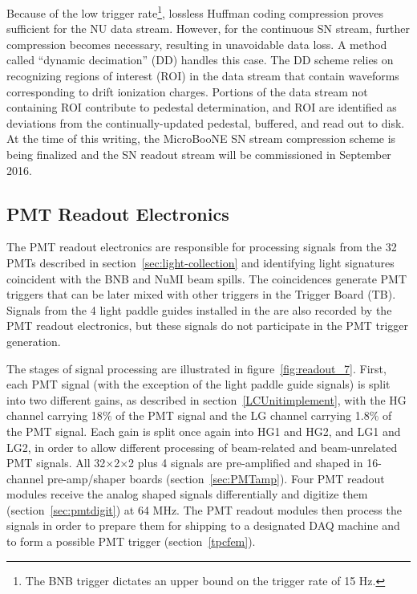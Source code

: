 Because of the low trigger rate\footnote{The BNB trigger dictates an upper bound on the trigger rate of 15 Hz.}, lossless Huffman coding compression proves sufficient for the NU data stream. However, for the continuous SN stream, further compression becomes necessary, resulting in unavoidable data loss. A method called ``dynamic decimation'' (DD) handles this case. The DD scheme relies on recognizing regions of interest (ROI) in the data stream that contain waveforms corresponding to drift ionization charges. Portions of the data stream not containing ROI contribute to pedestal determination, and ROI are identified as deviations from the continually-updated pedestal, buffered, and read out to disk. At the time of this writing, the MicroBooNE SN stream compression scheme is being finalized and the SN readout stream will be commissioned in September 2016.

\subsection{PMT Readout Electronics}

The PMT readout electronics are responsible for processing signals from the 32 PMTs described in section~\ref{sec:light-collection} and identifying light signatures coincident with the BNB and NuMI beam spills. The coincidences generate PMT triggers that can be later mixed with other triggers in the Trigger Board (TB). Signals from the 4 light paddle guides installed in the \lartpc are also recorded by the PMT readout electronics, but these signals do not participate in the PMT trigger generation. 

The stages of signal processing are illustrated in figure~\ref{fig:readout_7}. First, each PMT signal (with the exception of the light paddle guide signals) is split into two different gains, as described in section~\ref{LCUnitimplement}, with the HG channel carrying 18$\%$ of the PMT signal and the LG channel carrying 1.8$\%$ of the PMT signal. Each gain is split once again into HG1 and HG2, and LG1 and LG2, in order to allow different processing of beam-related and beam-unrelated PMT signals. All 32$\times$2$\times$2 plus 4 signals are pre-amplified and shaped in 16-channel pre-amp/shaper boards (section~\ref{sec:PMTamp}). Four PMT readout modules receive the analog shaped signals differentially and digitize them (section~\ref{sec:pmtdigit}) at 64 MHz. The PMT readout modules then process the signals in order to prepare them for shipping to a designated DAQ machine and to form a possible PMT trigger (section~\ref{tpcfem}). 

